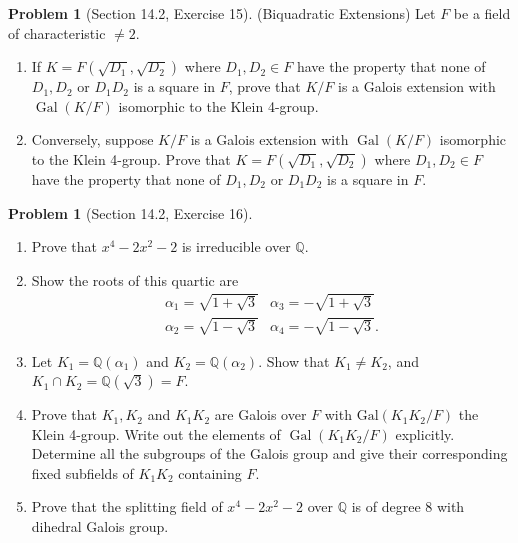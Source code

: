 \documentclass{amsart}
\numberwithin{equation}{section}
\theoremstyle{definition}
\newtheorem{problem}[thm]{Problem}
\begin{document}
\begin{problem}[Section 14.2, Exercise 15]
  (Biquadratic Extensions)
  Let \(F\) be a field of characteristic \(\neq 2\).
  \begin{enumerate}
\item If \(K=F\left(\sqrt{D_1}, \sqrt{D_2}\right)\) where \(D_1, D_2 \in F\) have the property that none of \(D_1, D_2\) or \(D_1 D_2\) is a square in \(F\), prove that \(K / F\) is a Galois extension with \(\operatorname{Gal}(K / F)\) isomorphic to the Klein 4-group.
\item Conversely, suppose \(K / F\) is a Galois extension with \(\operatorname{Gal}(K / F)\) isomorphic to the Klein 4-group. Prove that \(K=F\left(\sqrt{D_1}, \sqrt{D_2}\right)\) where \(D_1, D_2 \in F\) have the property that none of \(D_1, D_2\) or \(D_1 D_2\) is a square in \(F\).
  \end{enumerate}
\end{problem}


\begin{problem}[Section 14.2, Exercise 16]
  \begin{enumerate}
\item Prove that \(x^4-2 x^2-2\) is irreducible over \(\mathbb{Q}\).
\item Show the roots of this quartic are
\[
\begin{array}{ll}
\alpha_1=\sqrt{1+\sqrt{3}} & \alpha_3=-\sqrt{1+\sqrt{3}} \\
\alpha_2=\sqrt{1-\sqrt{3}} & \alpha_4=-\sqrt{1-\sqrt{3}} .
\end{array}
\]
\item Let \(K_1=\mathbb{Q}\left(\alpha_1\right)\) and \(K_2=\mathbb{Q}\left(\alpha_2\right)\). Show that \(K_1 \neq K_2\), and \(K_1 \cap K_2=\mathbb{Q}(\sqrt{3})=F\).
\item Prove that \(K_1, K_2\) and \(K_1 K_2\) are Galois over \(F\) with \(\mathrm{Gal}\left(K_1 K_2 / F\right)\) the Klein 4-group. Write out the elements of \(\operatorname{Gal}\left(K_1 K_2 / F\right)\) explicitly. Determine all the subgroups of the Galois group and give their corresponding fixed subfields of \(K_1 K_2\) containing \(F\).
\item Prove that the splitting field of \(x^4-2 x^2-2\) over \(\mathbb{Q}\) is of degree 8 with dihedral Galois group.
  \end{enumerate}
\end{problem}
\end{document}
